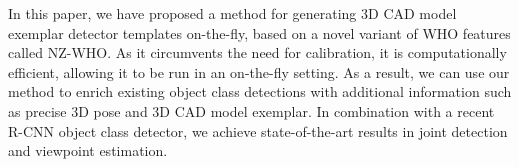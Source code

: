In this paper, we have proposed a method for generating 3D CAD model
exemplar detector templates on-the-fly, based on a novel variant of
WHO features called NZ-WHO. As it circumvents the need for
calibration, it is computationally efficient, allowing it to be run in
an on-the-fly setting. As a result, we can use our method to enrich
existing object class detections with additional information such as
precise 3D pose and 3D CAD model exemplar. In combination with a
recent R-CNN object class detector, we achieve state-of-the-art
results in joint detection and viewpoint estimation.
